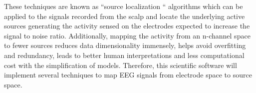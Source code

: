 \documentclass{article}
\begin{document}
These techniques are known as  ``source localization `` algorithms which can be applied to the signals recorded 
from the scalp and locate the underlying active sources generating the activity sensed on the electrodes expected 
to increase the signal to noise ratio. Additionally, mapping the activity from an n-channel space to fewer sources 
reduces data dimensionality immensely, helps avoid overfitting and redundancy, leads to better human 
interpretations and less computational cost with the simplification of models. Therefore, this scientific software will 
implement several techniques to map EEG signals from electrode space to source space.


%
%
%
\end{document}
